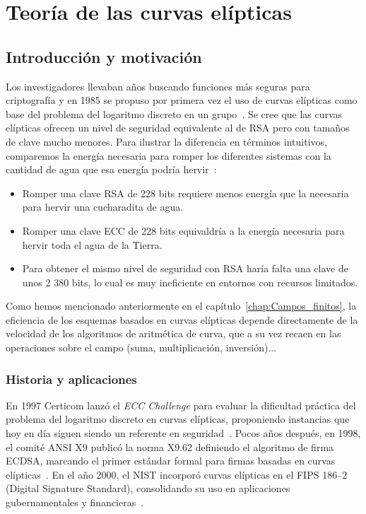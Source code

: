 \chapter{Teoría de las curvas elípticas}

\section{Introducción y motivación}
Los investigadores llevaban años buscando funciones más seguras para criptografía y en 1985 se propuso por primera vez el uso de curvas elípticas como base del problema del logaritmo discreto en un grupo~\cite{Koblitz1987,Miller1986}. Se cree que las curvas elípticas ofrecen un nivel de seguridad equivalente al de RSA pero con tamaños de clave mucho menores. Para ilustrar la diferencia en términos intuitivos, comparemos la energía necesaria para romper los diferentes sistemas con la cantidad de agua que esa energía podría hervir~\cite{Rickard2016,Lenstra2000}:
\begin{itemize}
  \item Romper una clave RSA de 228 bits requiere menos energía que la necesaria para hervir una cucharadita de agua.  
  \item Romper una clave ECC de 228 bits equivaldría a la energía necesaria para hervir toda el agua de la Tierra.  
  \item Para obtener el mismo nivel de seguridad con RSA haría falta una clave de unos 2 380 bits, lo cual es muy ineficiente en entornos con recursos limitados.  
\end{itemize}

Como hemos mencionado anteriormente en el capítulo~\ref{chap:Campos_finitos}, la eficiencia de los esquemas basados en curvas elípticas depende directamente de la velocidad de los algoritmos de aritmética de curva, que a su vez recaen en las operaciones sobre el campo (suma, multiplicación, inversión)...

\subsection{Historia y aplicaciones}
En 1997 Certicom lanzó el \emph{ECC Challenge} para evaluar la dificultad práctica del problema del logaritmo discreto en curvas elípticas, proponiendo instancias que hoy en día siguen siendo un referente en seguridad~\cite{gaudry2007breaking}. Pocos años después, en 1998, el comité ANSI X9 publicó la norma X9.62 definiendo el algoritmo de firma ECDSA, marcando el primer estándar formal para firmas basadas en curvas elípticas~\cite{ansi_x962_1998}. 
En el año 2000, el NIST incorporó curvas elípticas en el FIPS 186–2 (Digital Signature Standard), consolidando su uso en aplicaciones gubernamentales y financieras~\cite{nist_fips186_2}.

